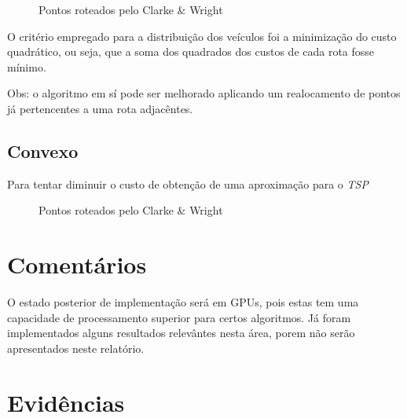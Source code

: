 \documentclass[a4paper, 12pt]{article}
\begin{document}
\begin{figure}[!ht]
\centering
{}
\caption{Pontos roteados pelo Clarke \& Wright}
\label{roteado}
\end{figure}


	O critério empregado para a distribuição dos veículos foi a minimização do
custo quadrático, ou seja, que a soma dos quadrados dos custos de cada rota
fosse mínimo. 

Obs: o algoritmo em sí pode ser melhorado aplicando um realocamento de pontos já
pertencentes a uma rota adjacêntes.


\subsection{Convexo}

	Para tentar diminuir o custo de obtenção de uma aproximação para o
\emph{TSP}

\begin{figure}[!ht]
\centering
{}
\caption{Pontos roteados pelo Clarke \& Wright}
\label{roteado}
\end{figure}

\section{Comentários}

	O estado posterior de implementação será em GPUs, pois estas tem uma
capacidade de processamento superior para certos algoritmos. Já foram
implementados alguns resultados relevântes nesta área, porem não serão
apresentados neste relatório.


\section{Evidências}
\end{document}
